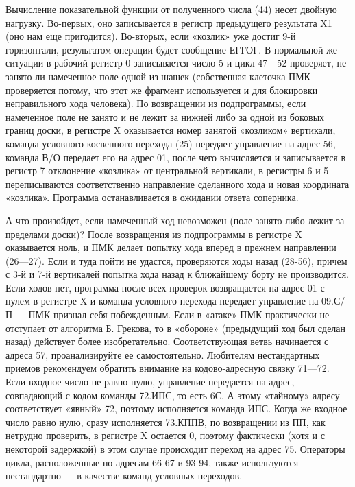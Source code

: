 \documentclass[11pt,a4paper,oneside]{article}
\begin{document}
Вычисление показательной функции от полученного числа (44) несет двойную нагрузку. Во-первых, оно записывается в регистр предыдущего результата X1 (оно нам еще пригодится). Во-вторых, если «козлик» уже достиг 9-й горизонтали, результатом операции будет сообщение ЕГГОГ. В нормальной же ситуации в рабочий регистр 0 записывается число 5 и цикл 47—52 проверяет, не занято ли намеченное поле одной из шашек (собственная клеточка ПМК проверяется потому, что этот же фрагмент используется и для блокировки неправильного хода человека). По возвращении из подпрограммы, если намеченное поле не занято и не лежит за нижней либо за одной из боковых границ доски, в регистре X оказывается номер занятой «козликом» вертикали, команда условного косвенного перехода (25) передает управление на адрес 56, команда В/О передает его на адрес 01, после чего вычисляется и записывается в регистр 7 отклонение «козлика» от центральной вертикали, в регистры 6 и 5 переписываются соответственно направление сделанного хода и новая координата «козлика». Программа останавливается в ожидании ответа соперника.

А что произойдет, если намеченный ход невозможен (поле занято либо лежит за пределами доски)? После возвращения из подпрограммы в регистре X оказывается ноль, и ПМК делает попытку хода вперед в прежнем направлении (26—27). Если и туда пойти не удастся, проверяются ходы назад (28-56), причем с 3-й и 7-й вертикалей попытка хода назад к ближайшему борту не производится. Если ходов нет, программа после всех проверок возвращается на адрес 01 с нулем в регистре X и команда условного перехода передает управление на 09.С/П — ПМК признал себя побежденным.
Если в «атаке» ПМК практически не отступает от алгоритма Б. Грекова, то в «обороне» (предыдущий ход был сделан назад) действует более изобретательно. Соответствующая ветвь начинается с адреса 57, проанализируйте ее самостоятельно. Любителям нестандартных приемов рекомендуем обратить внимание на кодово-адресную связку 71—72. Если входное число не равно нулю, управление передается на адрес, совпадающий с кодом команды 72.ИПС, то есть 6С. А этому «тайному» адресу соответствует «явный» 72, поэтому исполняется команда ИПС. Когда же входное число равно нулю, сразу исполняется 73.КППВ, по возвращении из ПП, как нетрудно проверить, в регистре X остается 0, поэтому фактически (хотя и с некоторой задержкой) в этом случае происходит переход на адрес 75. Операторы цикла, расположенные по адресам 66-67 и 93-94, также используются нестандартно — в качестве команд условных переходов.
\end{document}

